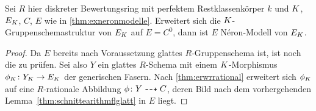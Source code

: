 \begin{Satz}\label{thm:fallstriktehenselisierung}
  Sei $R$ hier %
  diskreter Bewertungsring mit
  perfektem Restklassenkörper $k$
  und $K$, $E_{K}$, $C$, $E$ wie in \ref{thm:exneronmodelle}.
  Erweitert sich die $K$-Gruppenschemastruktur von $E_{K}$ auf
  $E=C^0$, dann ist $E$ Néron-Modell von $E_{K}$.
  \begin{proof}
    Da $E$ bereits nach Voraussetzung glattes $R$-Gruppenschema ist,
    ist noch die \NAbbEig zu prüfen.
    Sei also $Y$ ein glattes $R$-Schema mit einem $K$-Morphismus
    $\phi_{K}\colon Y_{K}\to E_{K}$ der generischen Fasern.
    Nach \ref{thm:erwrrational} erweitert sich $\phi_{K}$ auf eine
    $R$-rationale Abbildung $\phi\colon Y\dashrightarrow C$, deren Bild nach dem
    vorhergehenden Lemma~\ref{thm:schnittearithmflglatt} in $E$
    liegt.
    

\end{proof}
\end{Satz}
